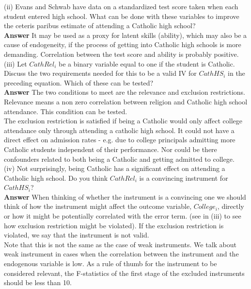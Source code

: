 \documentclass[12pt, oneside]{article}   	%
\begin{document}
 
(ii) Evans and Schwab have data on a standardized test score taken when
each student entered high school. What can be done with these variables
to improve the ceteris paribus estimate of attending a Catholic high
school?\\

\textbf{Answer} It may be used as a proxy for latent skills (ability), which may also be a cause of endogeneity, if the process of getting into Catholic high schools is more demanding. Correlation between the test score and ability is probably positive. \\ 
 
(iii) Let $CathRel_i$ be a binary variable equal to one if the student is Catholic.
Discuss the two requirements needed for this to be a valid IV for
$CathHS_i$ in the preceding equation. Which of these can be tested?\\
 
 \textbf{Answer} The two conditions to meet are the relevance and exclusion restrictions. Relevance means a non zero correlation between religion and Catholic high school attendance. This condition can be tested.  \\ 

The exclusion restriction is satisfied if being a Catholic would only affect college attendance only through attending a catholic high school. It could not have a direct effect on admission rates - e.g. due to college principals admitting more Catholic students independent of their performance. Nor could be there confounders related to both being a Catholic and getting admitted to college.\\
 
(iv) Not surprisingly, being Catholic has a significant effect on attending a
Catholic high school. Do you think $CathRel_i$ is a convincing instrument
for $CathHS_i$?\\

\textbf{Answer} When thinking of whether the instrument is a convincing one we should think of how the instrument might affect the outcome variable, $College_i$, directly or how it might be potentially correlated with the error term.  (see in (iii) to see how exclusion restriction might be violated). If the exclusion restriction is violated, we say that the instrument is not valid. \\

Note that this is not the same as the case of weak instruments. We talk about weak instrument in cases when the correlation between the instrument and the endogenous variable is low. As a rule of thumb for the instrument to be considered relevant, the F-statistics of the first stage of the excluded instruments should be less than 10.\\
\end{document}
